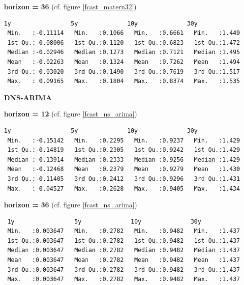 \textbf{horizon = 36} (cf. figure \ref{fcast_matern32})

\begin{verbatim}
1y                 5y              10y              30y       
 Min.   :-0.11114   Min.   :0.1066   Min.   :0.6661   Min.   :1.449  
 1st Qu.:-0.08006   1st Qu.:0.1120   1st Qu.:0.6823   1st Qu.:1.472  
 Median :-0.02946   Median :0.1273   Median :0.7121   Median :1.495  
 Mean   :-0.02263   Mean   :0.1324   Mean   :0.7262   Mean   :1.494  
 3rd Qu.: 0.03020   3rd Qu.:0.1490   3rd Qu.:0.7619   3rd Qu.:1.517  
 Max.   : 0.09165   Max.   :0.1804   Max.   :0.8374   Max.   :1.535 
\end{verbatim}

\textbf{DNS-ARIMA}

\textbf{horizon = 12} (cf. figure \ref{fcast_ns_arima})
\begin{verbatim}
1y                 5y              10y              30y       
 Min.   :-0.15142   Min.   :0.2295   Min.   :0.9237   Min.   :1.429  
 1st Qu.:-0.14819   1st Qu.:0.2305   1st Qu.:0.9242   1st Qu.:1.429  
 Median :-0.13914   Median :0.2333   Median :0.9256   Median :1.429  
 Mean   :-0.12468   Mean   :0.2379   Mean   :0.9279   Mean   :1.430  
 3rd Qu.:-0.11405   3rd Qu.:0.2412   3rd Qu.:0.9296   3rd Qu.:1.431  
 Max.   :-0.04527   Max.   :0.2628   Max.   :0.9405   Max.   :1.434 
\end{verbatim}

\textbf{horizon = 36} (cf. figure \ref{fcast_ns_arima})
\begin{verbatim}
 1y                 5y              10y              30y       
 Min.   :0.003647   Min.   :0.2782   Min.   :0.9482   Min.   :1.437  
 1st Qu.:0.003647   1st Qu.:0.2782   1st Qu.:0.9482   1st Qu.:1.437  
 Median :0.003647   Median :0.2782   Median :0.9482   Median :1.437  
 Mean   :0.003647   Mean   :0.2782   Mean   :0.9482   Mean   :1.437  
 3rd Qu.:0.003647   3rd Qu.:0.2782   3rd Qu.:0.9482   3rd Qu.:1.437  
 Max.   :0.003647   Max.   :0.2782   Max.   :0.9482   Max.   :1.437
\end{verbatim}
